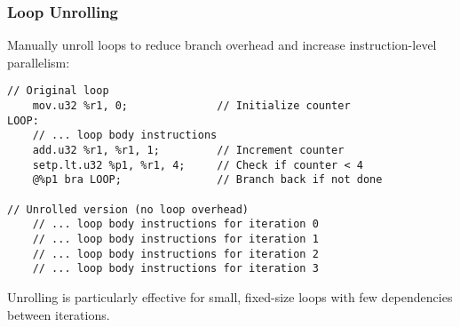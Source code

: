 \subsubsection{Loop Unrolling}

Manually unroll loops to reduce branch overhead and increase instruction-level parallelism:

\begin{lstlisting}[style=ptx]
// Original loop
    mov.u32 %r1, 0;              // Initialize counter
LOOP:
    // ... loop body instructions
    add.u32 %r1, %r1, 1;         // Increment counter
    setp.lt.u32 %p1, %r1, 4;     // Check if counter < 4
    @%p1 bra LOOP;               // Branch back if not done

// Unrolled version (no loop overhead)
    // ... loop body instructions for iteration 0
    // ... loop body instructions for iteration 1
    // ... loop body instructions for iteration 2
    // ... loop body instructions for iteration 3
\end{lstlisting}

Unrolling is particularly effective for small, fixed-size loops with few dependencies between iterations.

